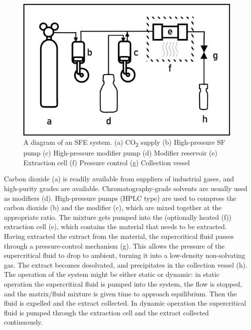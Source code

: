 \begin{figure}
\centering
\includegraphics[width=\textwidth]{Figures/SFE_System}
\decoRule

\caption[SFE system diagram]{A diagram of an SFE system. (a) CO\textsubscript{2} supply (b)
High-pressure SF pump (c) High-pressure modifier pump (d) Modifier reservoir (e)
Extraction cell (f) Pressure control (g) Collection vessel}

\label{fig:sfediagram}
\end{figure}


Carbon dioxide (a) is readily available from suppliers of industrial gases, and
high-purity grades are available. Chromatography-grade solvents are usually used
as modifiers (d). High-pressure pumps (HPLC type) are used to compress the
carbon dioxide (b) and the modifier (c), which are mixed together at the
appropriate ratio. The mixture gets pumped into the (optionally heated (f))
extraction cell (e), which contains the material that needs to be extracted.
Having extracted the extract from the material, the supercritical fluid passes
through a pressure-control mechanism (g). This allows the pressure of the
supercritical fluid to drop to ambient, turning it into a low-density
non-solvating gas. The extract becomes desolvated, and precipitates in the
collection vessel (h). The operation of the system might be either static or
dynamic: in static operation the supercritical fluid is pumped into the system,
the flow is stopped, and the matrix/fluid mixture is given time to approach
equilibrium. Then the fluid is expelled and the extract collected.
In dynamic operation the supercritical fluid is pumped through the extraction
cell and the extract collected continuously. 


